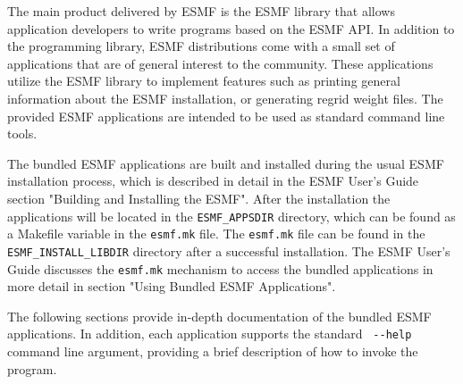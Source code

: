 
The main product delivered by ESMF is the ESMF library that allows application
developers to write programs based on the ESMF API. In addition to the 
programming library, ESMF distributions come with a small set of applications
that are of general interest to the community. These applications utilize
the ESMF library to implement features such as printing general information
about the ESMF installation, or generating regrid weight files. The provided
ESMF applications are intended to be used as standard command line tools.

The bundled ESMF applications are built and installed during the usual ESMF 
installation process, which is described in detail in the ESMF User's Guide 
section "Building and Installing the ESMF". After the installation the 
applications will be located in the {\tt ESMF\_APPSDIR} directory, which can 
be found as a Makefile variable in the {\tt esmf.mk} file. The {\tt esmf.mk} 
file can be found in the {\tt ESMF\_INSTALL\_LIBDIR} directory after a 
successful installation.  The ESMF User's Guide discusses the {\tt esmf.mk} 
mechanism to access the bundled applications in more detail in section 
"Using Bundled ESMF Applications".

The following sections provide in-depth documentation of the bundled ESMF 
applications. In addition, each application supports the standard 
\verb+ --help + command line argument, providing a brief description of how 
to invoke the program.

